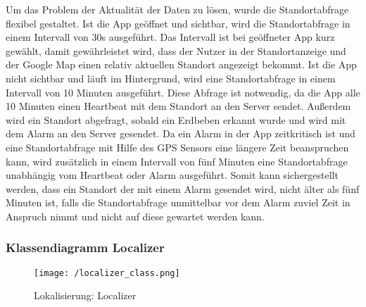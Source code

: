 \par\bigskip
Um das Problem der Aktualität der Daten zu lösen, wurde die Standortabfrage flexibel gestaltet. Ist die App geöffnet und sichtbar, wird die Standortabfrage in einem Intervall von 30s ausgeführt. Das Intervall ist bei geöffneter App kurz gewählt, damit gewährleistet wird, dass der Nutzer in der Standortanzeige und der Google Map einen relativ aktuellen Standort angezeigt bekommt. Ist die App nicht sichtbar und läuft im Hintergrund, wird eine Standortabfrage in einem Intervall von 10 Minuten ausgeführt. Diese Abfrage ist notwendig, da die App alle 10 Minuten einen Heartbeat mit dem Standort an den Server sendet. Außerdem wird ein Standort abgefragt, sobald ein Erdbeben erkannt wurde und wird mit dem Alarm an den Server gesendet. Da ein Alarm in der App zeitkritisch ist und eine Standortabfrage mit Hilfe des GPS Sensors eine längere Zeit beanspruchen kann, wird zusätzlich in einem Intervall von fünf Minuten eine Standortabfrage unabhängig vom Heartbeat oder Alarm ausgeführt. Somit kann sichergestellt werden, dass ein Standort der mit einem Alarm gesendet wird, nicht älter als fünf Minuten ist, falls die Standortabfrage unmittelbar vor dem Alarm zuviel Zeit in Anspruch nimmt und nicht auf diese gewartet werden kann.

\subsubsection{Klassendiagramm Localizer}
\begin{figure}[H]
	\centering
	\texttt{[image: /localizer\_class.png]}
	\caption{Lokalisierung: Localizer}
	\label{fig:localizerClass}
\end{figure}